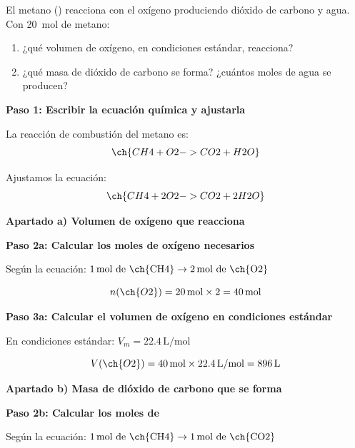 \begin{exercise}
    El metano () reacciona con el oxígeno produciendo dióxido de carbono y agua.
    Con \qty{20}{\mol} de metano:
    \begin{enumerate}[label=\letraminuscula]
    \item ¿qué volumen de oxígeno, en condiciones estándar, reacciona?
    \item ¿qué masa de dióxido de carbono se forma?
    ¿cuántos moles de agua se producen?
    \end{enumerate}
    \begin{solu}
        \textbf{Paso 1: Escribir la ecuación química y ajustarla}

        La reacción de combustión del metano es:
        \begin{equation*}
            \ch{CH4 + O2 -> CO2 + H2O}
        \end{equation*}

        Ajustamos la ecuación:
        \begin{equation*}
            \ch{CH4 + 2 O2 -> CO2 + 2 H2O}
        \end{equation*}

        \textbf{Apartado a) Volumen de oxígeno que reacciona}

        \textbf{Paso 2a: Calcular los moles de oxígeno necesarios}

        Según la ecuación: $1\,\text{mol de \ch{CH4}} \rightarrow 2\,\text{mol de \ch{O2}}$

        \begin{equation*}
            n(\ch{O2}) = 20\,\text{mol} \times 2 = 40\,\text{mol}
        \end{equation*}

        \textbf{Paso 3a: Calcular el volumen de oxígeno en condiciones estándar}

        En condiciones estándar: $V_m = 22.4\,\text{L/mol}$

        \begin{equation*}
            V(\ch{O2}) = 40\,\text{mol} \times 22.4\,\text{L/mol} = 896\,\text{L}
        \end{equation*}

        \textbf{Apartado b) Masa de dióxido de carbono que se forma}

        \textbf{Paso 2b: Calcular los moles de }

        Según la ecuación: $1\,\text{mol de \ch{CH4}} \rightarrow 1\,\text{mol de \ch{CO2}}$


\end{solu}
\end{exercise}

